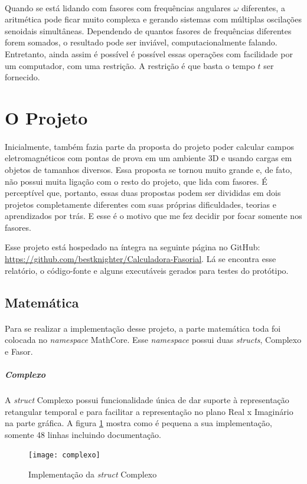 \documentclass[conference,harvard, brazil]{sbatex}
\begin{document}
	\paragraph{}Quando se está lidando com fasores com frequências angulares $\omega$ diferentes, a aritmética pode ficar muito complexa e gerando sistemas com múltiplas oscilações senoidais simultâneas. Dependendo de quantos fasores de frequências diferentes forem somados, o resultado pode ser inviável, computacionalmente falando. Entretanto, ainda assim é possível é possível essas operações com facilidade por um computador, com uma restrição. A restrição é que basta o tempo $t$ ser fornecido.
	
	\section{O Projeto}
	\paragraph{}Inicialmente, também fazia parte da proposta do projeto poder calcular campos eletromagnéticos com pontas de prova em um ambiente 3D e usando cargas em objetos de tamanhos diversos. Essa proposta se tornou muito grande e, de fato, não possui muita ligação com o resto do projeto, que lida com fasores. É perceptível que, portanto, essas duas propostas podem ser divididas em dois projetos completamente diferentes com suas próprias dificuldades, teorias e aprendizados por trás. E esse é o motivo que me fez decidir por focar somente nos fasores.

	Esse projeto está hospedado na íntegra na seguinte página no GitHub: \url{https://github.com/bestknighter/Calculadora-Fasorial}. Lá se encontra esse relatório, o código-fonte e alguns executáveis gerados para testes do protótipo.
	
	\subsection{Matemática}
	\paragraph{}Para se realizar a implementação desse projeto, a parte matemática toda foi colocada no {\em namespace} MathCore. Esse {\em namespace} possui duas {\em structs}, Complexo e Fasor.
	
	\subparagraph{Complexo}A {\em struct} Complexo possui funcionalidade única de dar suporte à representação retangular temporal e para facilitar a representação no plano Real x Imaginário na parte gráfica. A figura \ref{fig:complexo} mostra como é pequena a sua implementação, somente 48 linhas incluindo documentação.
	\begin{figure}[h]
		\texttt{[image: complexo]}
		\caption{Implementação da {\em struct} Complexo}
		\label{fig:complexo}
	\end{figure}
	
\end{document}

